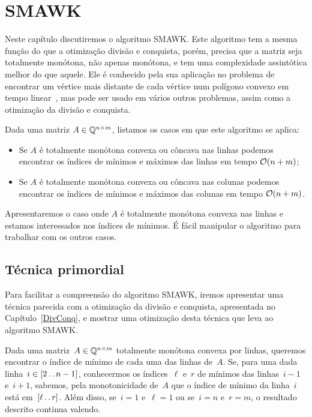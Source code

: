 \chapter{SMAWK}
\label{SMAWK}


Neste capítulo discutiremos o algoritmo SMAWK. Este algoritmo tem a mesma função do que a otimização divisão e conquista, porém, precisa que a matriz seja totalmente monótona, não apenas monótona, e tem uma complexidade assintótica melhor do que aquele. Ele é conhecido pela sua aplicação no problema de encontrar um vértice mais distante de cada vértice num polígono convexo em tempo linear~\cite{Aggarwal:1987}, mas pode ser usado em vários outros problemas, assim como a otimização da divisão e conquista.

Dada uma matriz $A \in \mathbb{Q}^{n \times m}$, listamos os casos em que este algoritmo se aplica:
\begin{itemize}
    \item Se $A$ é totalmente monótona convexa ou côncava nas linhas podemos encontrar os índices de mínimos e máximos das linhas em tempo $\mathcal{O}(n + m)$;
    \item Se $A$ é totalmente monótona convexa ou côncava nas colunas podemos encontrar os índices de mínimos e máximos das colunas em tempo $\mathcal{O}(n + m)$.
\end{itemize}

Apresentaremos o caso onde $A$ é totalmente monótona convexa nas linhas e estamos interessados nos índices de mínimos. É fácil manipular o algoritmo para trabalhar com os outros casos.


\section{Técnica primordial} \label{SMAWK:primordial}
Para facilitar a compreensão do algoritmo SMAWK, iremos apresentar uma técnica parecida com a otimização da divisão e conquista, apresentada no Capítulo~\ref{DivConq}, e mostrar uma otimização desta técnica que leva ao algoritmo SMAWK.

Dada uma matriz~$A \in \mathbb{Q}^{n \times m}$ totalmente monótona convexa por linhas, queremos encontrar o índice de mínimo de cada uma das linhas de~$A$. Se, para uma dada linha~${ i \in [2 \,.\,.\, n-1] }$, conhecermos os índices~$\ell$ e~$r$ de mínimos das linhas~${ i-1 }$ e~${ i+1 }$, sabemos, pela monotonicidade de~$A$ que o índice de mínimo da linha~$i$ está em~${ [\ell \,.\,.\, r] }$. Além disso, se~${ i = 1 }$ e~${ \ell = 1 }$ ou se~${ i = n }$ e~${ r = m }$, o resultado descrito continua valendo.

